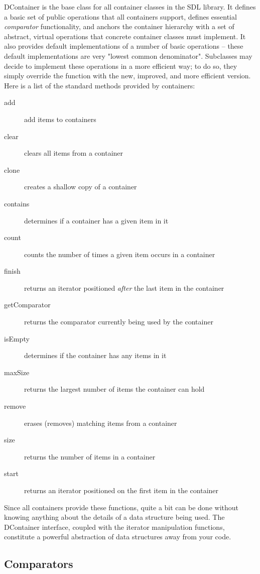 \documentclass{report}
\begin{document}
DContainer is the base class for all container classes in the SDL library.
It defines a basic set of public operations that all containers support,
defines essential \emph{comparator} functionality, and anchors the container
hierarchy with a set of abstract, virtual operations that concrete container
classes must implement. It also provides default implementations of a number
of basic operations -- these default implementations are very "lowest common
denominator". Subclasses may decide to implement these operations in a more
efficient way; to do so, they simply override the function with the new,
improved, and more efficient version. Here is a list of the standard methods
provided by containers:

\begin{description}
\item[add] add items to containers
\item[clear] clears all items from a container
\item[clone] creates a shallow copy of a container
\item[contains] determines if a container has a given item in it
\item[count] counts the number of times a given item occurs in a container
\item[finish] returns an iterator positioned \emph{after} the last item in the container
\item[getComparator] returns the comparator currently being used by the container
\item[isEmpty] determines if the container has any items in it
\item[maxSize] returns the largest number of items the container can hold
\item[remove] erases (removes) matching items from a container
\item[size] returns the number of items in a container
\item[start] returns an iterator positioned on the first item in the container
\end{description}

Since all containers provide these functions, quite a bit can be done
without knowing anything about the details of a data structure being used.
The DContainer interface, coupled with the iterator manipulation functions,
constitute a powerful abstraction of data structures away from your code.

\subsection{Comparators}
\end{document}
